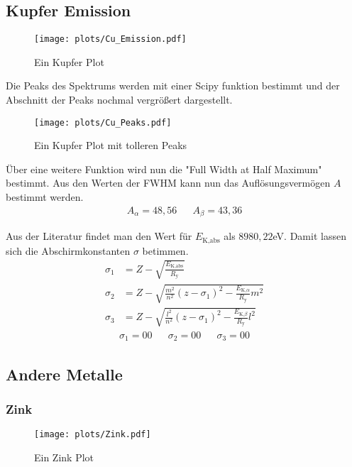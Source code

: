 \subsection{Kupfer Emission}
\begin{figure}
    \centering
    \texttt{[image: plots/Cu\_Emission.pdf]}
    \caption{Ein Kupfer Plot}
    \label{fig:Cu_Emission}
\end{figure}
Die Peaks des Spektrums werden mit einer Scipy funktion bestimmt und der Abschnitt der Peaks nochmal vergrößert dargestellt.
\begin{figure}
    \centering
    \texttt{[image: plots/Cu\_Peaks.pdf]}
    \caption{Ein Kupfer Plot mit tolleren Peaks}
    \label{fig:Cu_Peaks}
\end{figure}
Über eine weitere Funktion wird nun die "Full Width at Half Maximum" bestimmt.
Aus den Werten der FWHM kann nun das Auflösungsvermögen $A$ bestimmt werden.
\begin{align}
    A_{\alpha}= 48,56 && A_{\beta} = 43,36
\end{align}

Aus der Literatur findet man den Wert für $E_{\text{K,abs}}$ als $8980,22$eV.
Damit lassen sich die Abschirmkonstanten $\sigma$ betimmen.
\begin{align}
    \sigma_1 &= Z-\sqrt{\frac{E_{\text{K,abs}}}{R_{\text{y}}}} \\
    \sigma_2 &= Z-\sqrt{ \frac{m^2}{n^2}\left(z-\sigma_1\right)^2- \frac{E_{\text{K,}\alpha}}{R_{\text{y}}}m^2 } \\
    \sigma_3 &= Z-\sqrt{ \frac{l^2}{n^2}\left(z-\sigma_1\right)^2- \frac{E_{\text{K,}\beta}}{R_{\text{y}}}l^2 }
\end{align}
\begin{align}
    \sigma_1 = 00 && \sigma_2 = 00 && \sigma_3 = 00 
\end{align}

\subsection{Andere Metalle}
\subsubsection{Zink}
\begin{figure}
    \centering
    \texttt{[image: plots/Zink.pdf]}
    \caption{Ein Zink Plot}
    \label{fig:Zink}
\end{figure}

